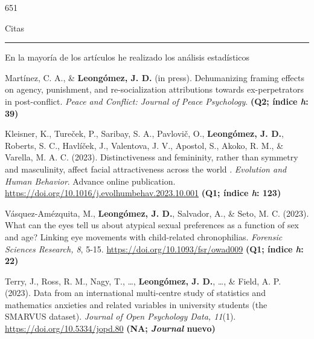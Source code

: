 \documentclass[11pt,a4paper,]{awesome-cv}
\begin{document}
\begin{tcolorbox}[enhanced,
        on line, 
        boxsep=4pt, left=0pt,right=0pt,top=0pt,bottom=0pt,
        colframe=white,colback=blue,
        hyperurl={https://scholar.google.com/citations?user=8Q0jKHsAAAAJ}]
\begin{minipage}[c]{0.12\linewidth}
\end{minipage} \begin{minipage}[c]{0.18\linewidth}  
  \begin{center} \begin{huge} 651 \end{huge} 
  \begin{small} Citas \end{small} \end{center}
\end{minipage}
\begin{center}
\noindent\rule{8cm}{0.4pt}
\end{center}
\begin{center}
\footnotesize{En la mayoría de los artículos he realizado los análisis estadísticos}\end{center}
\end{tcolorbox}

\begingroup
\footnotesize
\setlength{\parindent}{-0.5in}
\setlength{\leftskip}{0.5in}

Martínez, C. A., \& \textbf{Leongómez, J. D.} (in press). Dehumanizing
framing effects on agency, punishment, and re-socialization attributions
towards ex-perpetrators in post-conflict. \emph{Peace and Conflict:
Journal of Peace Psychology}. \textbf{(Q2; índice \emph{h}: 39)}

Kleisner, K., Tureček, P., Saribay, S. A., Pavlovič, O.,
\textbf{Leongómez, J. D.}, Roberts, S. C., Havlíček, J., Valentova, J.
V., Apostol, S., Akoko, R. M., \& Varella, M. A. C. (2023).
Distinctiveness and femininity, rather than symmetry and masculinity,
affect facial attractiveness across the world . \emph{Evolution and
Human Behavior}. Advance online publication.
\href{https://authors.elsevier.com/c/1hyfr3tz492kal}{https://doi.org/10.1016/j.evolhumbehav.2023.10.001}
\textbf{(Q1; índice \emph{h}: 123)}

Vásquez-Amézquita, M., \textbf{Leongómez, J. D.}, Salvador, A., \& Seto,
M. C. (2023). What can the eyes tell us about atypical sexual
preferences as a function of sex and age? Linking eye movements with
child-related chronophilias. \emph{Forensic Sciences Research, 8}, 5-15.
\url{https://doi.org/10.1093/fsr/owad009} \textbf{(Q1; índice \emph{h}:
22)}

Terry, J., Ross, R. M., Nagy, T., \ldots, \textbf{Leongómez, J. D.},
\ldots, \& Field, A. P. (2023). Data from an international multi-centre
study of statistics and mathematics anxieties and related variables in
university students (the SMARVUS dataset). \emph{Journal of Open
Psychology Data, 11}(1). \url{https://doi.org/10.5334/jopd.80}
\textbf{(NA; \emph{Journal} nuevo)}
\end{document}
